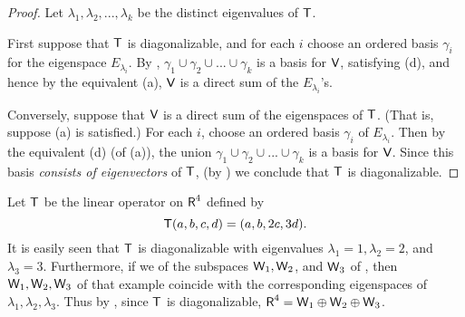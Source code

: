\begin{proof}
Let \(\lambda_1, \lambda_2, ..., \lambda_k\) be the distinct eigenvalues of \(\textsf{T}\).

First suppose that \(\textsf{T}\) is diagonalizable, and for each \(i\) choose an ordered basis \(\gamma_i\) for the eigenspace \(E_{\lambda_i}\).
By , \(\gamma_1 \cup \gamma_2 \cup ... \cup \gamma_k\) is a basis for \(\textsf{V}\), satisfying (d), and hence by the equivalent (a), \(\textsf{V}\) is a direct sum of the \(E_{\lambda_i}\)'s.

Conversely, suppose that \(\textsf{V}\) is a direct sum of the eigenspaces of \(\textsf{T}\).
(That is, suppose (a) is satisfied.)
For each \(i\), choose an ordered basis \(\gamma_i\) of \(E_{\lambda_i}\).
Then by the equivalent (d) (of (a)), the union \(\gamma_1 \cup \gamma_2 \cup ... \cup \gamma_k\) is a basis for \(\textsf{V}\).
Since this basis \emph{consists of eigenvectors} of \(\textsf{T}\), (by ) we conclude that \(\textsf{T}\) is diagonalizable.
\end{proof}

\begin{example} \label{example 5.2.10}
Let \(\textsf{T}\) be the linear operator on \(\textsf{R}^4\) defined by
\[
    \textsf{T}(a, b, c, d) = (a, b, 2c, 3d).
\]
It is easily seen that \(\textsf{T}\) is diagonalizable with eigenvalues \(\lambda_1 = 1, \lambda_2 = 2\), and \(\lambda_3 = 3\).
Furthermore, if we  of the subspaces \(\textsf{W}_1, \textsf{W}_2\), and \(\textsf{W}_3\) of , then \(\textsf{W}_1, \textsf{W}_2, \textsf{W}_3\) of that example coincide with the corresponding eigenspaces of \(\lambda_1, \lambda_2, \lambda_3\).
Thus by , since \(\textsf{T}\) is diagonalizable, \(\textsf{R}^4 = \textsf{W}_1 \oplus \textsf{W}_2 \oplus \textsf{W}_3\).
\end{example}
